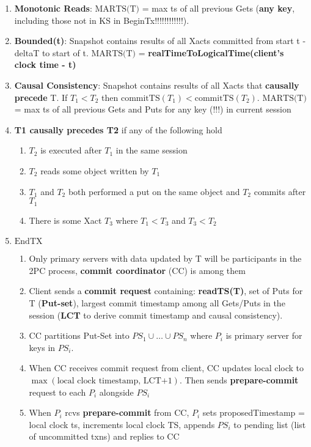 \documentclass[8pt, landscape]{extarticle}
\begin{document}
\begin{multicols*}{4}
\begin{enumerate}
    \item \textbf{Monotonic Reads}: $\text{MARTS(T)}$ = max ts of all previous Gets (\textbf{any key}, including those not in KS in BeginTx!!!!!!!!!!!!).
    \item \textbf{Bounded(t)}: Snapshot contains results of all Xacts committed from start t - deltaT to start of t. $\text{MARTS(T)}$ = \textbf{realTimeToLogicalTime(client's clock time - t)}
    \item \textbf{Causal Consistency}: Snapshot contains results of all Xacts that \textbf{causally precede} T. If $T_1 < T_2$ then $\text{commitTS}(T_1) < \text{commitTS}(T_2)$. $\text{MARTS(T)}$ = max ts of all previous Gets and Puts for any key (!!!) in current session
    \item \textbf{T1 causally precedes T2} if any of the following hold
    \begin{enumerate}
        \item $T_2$ is executed after $T_1$ in the same session
        \item $T_2$ reads some object written by $T_1$
        \item $T_1$ and $T_2$ both performed a put on the same object and $T_2$ commits after $T_1$
        \item There is some Xact $T_3$ where $T_1 < T_3$ and $T_3 < T_2$
    \end{enumerate}
    \item $\text{EndTX}$
    \begin{enumerate}
        \item Only primary servers with data updated by T will be participants in the 2PC process, \textbf{commit coordinator} (CC) is among them
        \item Client sends a \textbf{commit request} containing: \textbf{readTS(T)}, set of Puts for T (\textbf{Put-set}), largest commit timestamp among all Gets/Puts in the session (\textbf{LCT} to derive commit timestamp and causal consistency).
        \item CC partitions Put-Set into $PS_1 \cup \dots \cup PS_n$ where $P_i$ is primary server for keys in $PS_i$.
        \item When CC receives commit request from client, CC updates local clock to $\max(\text{local clock timestamp, LCT+1})$. Then sends \textbf{prepare-commit} request to each $P_i$ alongside $PS_i$
        \item When $P_i$ rcvs \textbf{prepare-commit} from CC, $P_i$ sets proposedTimestamp = local clock ts, increments local clock TS, appends $PS_i$ to pending list (list of uncommitted txns) and replies to CC

\end{enumerate}
\end{enumerate}
\end{multicols*}
\end{document}

